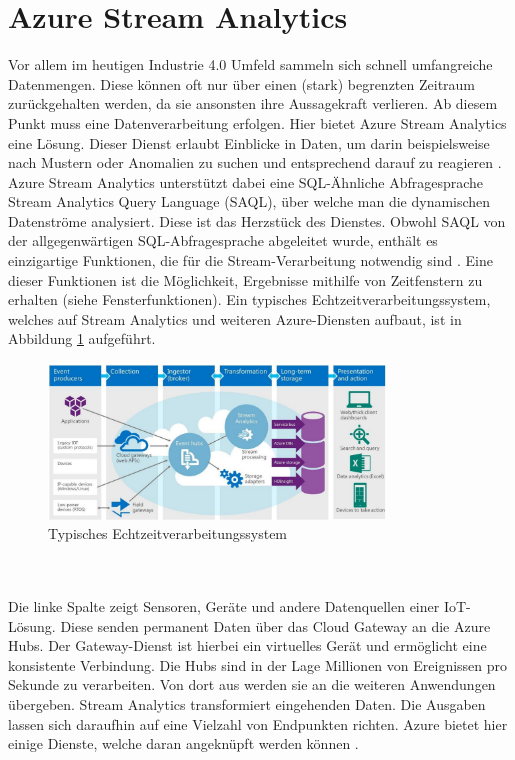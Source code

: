\section{Azure Stream Analytics}
Vor allem im heutigen Industrie 4.0 Umfeld sammeln sich schnell umfangreiche Datenmengen. Diese können oft nur über einen (stark) begrenzten Zeitraum zurückgehalten werden, da sie ansonsten ihre Aussagekraft verlieren. Ab diesem Punkt muss eine Datenverarbeitung erfolgen. Hier bietet Azure Stream Analytics eine Lösung. Dieser Dienst erlaubt Einblicke in Daten, um darin beispielsweise nach Mustern oder Anomalien zu suchen und entsprechend darauf zu reagieren \cite{Klein.2017}. Azure Stream Analytics unterstützt dabei eine SQL-Ähnliche Abfragesprache Stream Analytics Query Language (SAQL), über welche man die dynamischen Datenströme analysiert. Diese ist das Herzstück des Dienstes. Obwohl SAQL von der allgegenwärtigen SQL-Abfragesprache abgeleitet wurde, enthält es einzigartige Funktionen, die für die Stream-Verarbeitung notwendig sind \cite{Prosise.}. Eine dieser Funktionen ist die Möglichkeit, Ergebnisse mithilfe von Zeitfenstern zu erhalten (siehe Fensterfunktionen). Ein typisches Echtzeitverarbeitungssystem, welches auf Stream Analytics und weiteren Azure-Diensten aufbaut, ist in Abbildung \ref{uebersicht} aufgeführt.
\begin{figure}[ht]
	\centering
	\includegraphics[width=0.8\textwidth,]{images/StreamAnalytics}
	\caption{Typisches Echtzeitverarbeitungssystem \cite{Prosise.}}
	\label{uebersicht}
\end{figure}
\\ \\Die linke Spalte zeigt Sensoren, Geräte und andere Datenquellen einer IoT-Lösung. Diese senden permanent Daten über das Cloud Gateway an die Azure Hubs. Der Gateway-Dienst ist hierbei ein virtuelles Gerät und ermöglicht eine konsistente Verbindung. Die Hubs sind in der Lage Millionen von Ereignissen pro Sekunde zu verarbeiten. Von dort aus werden sie an die weiteren Anwendungen übergeben. Stream Analytics transformiert eingehenden Daten. Die Ausgaben lassen sich daraufhin auf eine Vielzahl von Endpunkten richten. Azure bietet hier einige Dienste, welche daran angeknüpft werden können \cite{Prosise.}. \\
